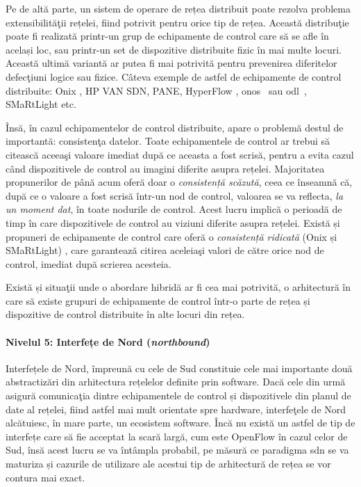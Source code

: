 Pe de altă parte, un sistem de operare de rețea distribuit poate rezolva problema extensibilităţii rețelei, fiind potrivit pentru orice tip de rețea. Această distribuţie poate fi realizată printr-un grup de echipamente de control care să se afle în același loc, sau printr-un set de dispozitive distribuite fizic în mai multe locuri. Această ultimă variantă ar putea fi mai potrivită pentru prevenirea diferitelor defecţiuni logice sau fizice. Câteva exemple de astfel de echipamente de control distribuite: Onix \cite{koponen2010onix}, HP VAN SDN, PANE, HyperFlow \cite{tootoonchian2010hyperflow}, \gls{onos}~\cite{berde2014onos} sau \gls{odl}~\cite{medved2014opendaylight}, SMaRtLight \cite{botelho2014smartlight} etc.

Însă, în cazul echipamentelor de control distribuite, apare o problemă destul de importantă: consistenţa datelor. Toate echipamentele de control ar trebui să citească aceeaşi valoare imediat după ce aceasta a fost scrisă, pentru a evita cazul când dispozitivele de control au imagini diferite asupra rețelei. Majoritatea propunerilor de până acum oferă doar o \textit{consistență scăzută}, ceea ce înseamnă că, după ce o valoare a fost scrisă într-un nod de control, valoarea se va reflecta, \textit{la un moment dat}, în toate nodurile de control. Acest lucru implică o perioadă de timp în care dispozitivele de control au viziuni diferite asupra rețelei. Există și propuneri de echipamente de control care oferă o \textit{consistență ridicată} (Onix și SMaRtLight) \cite{koponen2010onix, botelho2014smartlight}, care garantează citirea aceleiaşi valori de către orice nod de control, imediat după scrierea acesteia.

Există și situaţii unde o abordare hibridă ar fi cea mai potrivită, o arhitectură în care să existe grupuri de echipamente de control într-o parte de rețea și dispozitive de control distribuite în alte locuri din rețea.

\paragraph{Nivelul 5: Interfețe de Nord (\textit{northbound})}

Interfețele de Nord, împreună cu cele de Sud constituie cele mai importante două abstractizări din arhitectura rețelelor definite prin software. Dacă cele din urmă asigură comunicaţia dintre echipamentele de control și dispozitivele din planul de date al rețelei, fiind astfel mai mult orientate spre hardware, interfeţele de Nord alcătuiesc, în mare parte, un ecosistem software. Încă nu există un astfel de tip de interfețe care să fie acceptat la scară largă, cum este OpenFlow în cazul celor de Sud, însă acest lucru se va întâmpla probabil, pe măsură ce paradigma \gls{sdn} se va maturiza și cazurile de utilizare ale acestui tip de arhitectură de rețea se vor contura mai exact.

